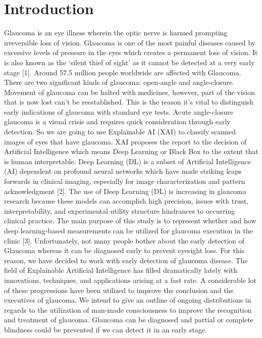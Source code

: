 \documentclass[conference]{IEEEtran}
\begin{document}
\section{Introduction}
Glaucoma is an eye illness wherein the optic nerve is harmed prompting irreversible loss of vision. Glaucoma is one of the most painful diseases caused by excessive levels of pressure in the eyes which creates a permanent loss of vision. It is also known as the ‘silent thief of sight’ as it cannot be detected at a very early stage [1]. Around 57.5 million people worldwide are affected with Glaucoma. There are two significant kinds of glaucoma: open-angle and angle-closure. Movement of glaucoma can be halted with medicines, however, part of the vision that is now lost can't be reestablished. This is the reason it's vital to distinguish early indications of glaucoma with standard eye tests. Acute angle-closure glaucoma is a visual crisis and requires quick consideration through early detection. 
So we are going to use Explainable AI (XAI) to classify scanned images of eyes that have glaucoma. XAI proposes the report to the decision of Artificial Intelligence which means Deep Learning or Black Box to the extent that is human interpretable. Deep Learning (DL) is a subset of Artificial Intelligence (AI) dependent on profound neural networks which have made striking leaps forwards in clinical imaging, especially for image characterization and pattern acknowledgment [2]. The use of Deep Learning (DL) is increasing in glaucoma research because these models can accomplish high precision, issues with trust, interpretability, and experimental utility structure hindrances to occurring clinical practice. 
The main purpose of this study is to represent whether and how deep learning-based measurements can be utilized for glaucoma execution in the clinic [3]. Unfortunately, not many people bother about the early detection of Glaucoma whereas it can be diagnosed early to prevent eyesight loss. For this reason, we have decided to work with early detection of glaucoma disease. The field of Explainable Artificial Intelligence has filled dramatically lately with innovations, techniques, and applications arising at a fast rate. A considerable lot of these progressions have been utilized to improve the conclusion and the executives of glaucoma. We intend to give an outline of ongoing distributions in regards to the utilization of man-made consciousness to improve the recognition and treatment of glaucoma. Glaucoma can be diagnosed and partial or complete blindness could be prevented if we can detect it in an early stage.
\end{document}
